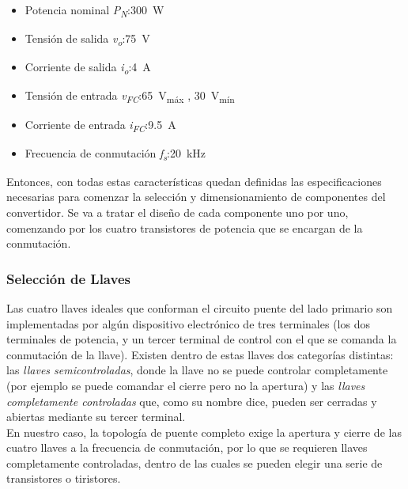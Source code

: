 \begin{itemize}
    \item {\SemiBold Potencia nominal \textit{P\textsubscript{N}}:}\quad\SI[]{300}[]{\watt}
    \item {\SemiBold Tensión de salida \textit{v\textsubscript{o}}:}\quad\SI[]{75}[]{\volt}
    \item {\SemiBold Corriente de salida \textit{i\textsubscript{o}}:}\quad\SI[]{4}[]{\ampere}
    \item {\SemiBold Tensión de entrada \textit{v\textsubscript{FC}}:}\quad\SI[]{65}[]{\volt}\textsubscript{máx} , \SI[]{30}[]{\volt}\textsubscript{mín}
    \item {\SemiBold Corriente de entrada \textit{i\textsubscript{FC}}:}\quad\SI[]{9.5}[]{\ampere}
    \item {\SemiBold Frecuencia de conmutación \textit{f\textsubscript{s}}:}\quad\SI[]{20}[]{\kilo\hertz}
\end{itemize}

Entonces, con todas estas características quedan definidas las especificaciones necesarias para comenzar la selección y dimensionamiento de componentes del convertidor. Se va a tratar el diseño de cada componente uno por uno, comenzando por los cuatro transistores de potencia que se encargan de la conmutación.\\

\subsubsection{Selección de Llaves}

Las cuatro llaves ideales que conforman el circuito puente del lado primario son implementadas por algún dispositivo electrónico de tres terminales (los dos terminales de potencia, y un tercer terminal de control con el que se comanda la conmutación de la llave). Existen dentro de estas llaves dos categorías distintas: las \textit{llaves semicontroladas}, donde la llave no se puede controlar completamente (por ejemplo se puede comandar el cierre pero no la apertura) y las \textit{llaves completamente controladas} que, como su nombre dice, pueden ser cerradas y abiertas mediante su tercer terminal.\\

En nuestro caso, la topología de puente completo exige la apertura y cierre de las cuatro llaves a la frecuencia de conmutación, por lo que se requieren {\Medium llaves completamente controladas}, dentro de las cuales se pueden elegir una serie de transistores o tiristores.\\


